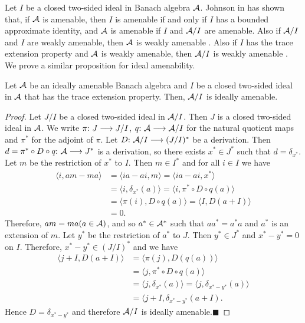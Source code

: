 \documentclass[fleqn]{mat01}
\begin{document}
Let $I$ be a closed two-sided ideal in Banach algebra $\cal A$.
Johnson in \cite{Jo1} has shown that, if ${\cal A}$ is amenable,
then $I$ is amenable if and only if $I$ has a bounded approximate
identity, and $\cal A$ is amenable if $I$ and ${\cal A}/I$ are amenable.
Also if ${\cal A}/I$ and $I$ are weakly amenable, then $\cal A$ is
weakly amenable \cite{Gr2}. Also if $I$ has the trace extension property
and $\cal A$ is weakly amenable, then ${\cal A}/I$ is weakly amenable
\cite{Gr2}. We prove a similar proposition for ideal amenability.

\begin{theor}[\!]
Let ${\cal A}$ be an ideally amenable Banach algebra and $I$ be a closed
two-sided ideal in ${\cal A}$ that has the trace extension property.
Then{\rm ,} ${\cal A} /I$ is ideally amenable.
\end{theor}

\begin{proof}
Let $J/I$ be a closed two-sided ideal in ${\cal A}/ I$. Then $J$ is a
closed two-sided ideal in ${\cal A}$. We write $\pi\hbox{:}\ J
\longrightarrow J/I$, $q\hbox{:}\ {\cal A} \longrightarrow {\cal A} /I$
for the natural quotient maps and $\pi ^*$ for the adjoint of $\pi$. Let
$D\hbox{:}\ {\cal A}/I \longrightarrow (J/I)^*$ be a derivation. Then
$d= \pi^* \circ D \circ q\hbox{:}\ {\cal A} \longrightarrow J^*$ is a
derivation, so there exists $x^* \in J^*$ such that $d = \delta _{x^*}$.
Let $m$ be the restriction of $x^*$ to $I$. Then $m \in I^*$ and for all
$i \in I$ we have
\begin{align*}
\langle i, am -ma \rangle &= \langle ia -ai , m \rangle = \langle ia
-ai, x^*\rangle \\[.2pc]
&= \langle i , \delta _{x^*} (a) \rangle = \langle i , \pi^* \circ D
\circ q (a) \rangle \\[.2pc]
&= \langle \pi (i) , D \circ q (a) \rangle = \langle I , D(a+I)\rangle\\[.2pc]
&= 0.
\end{align*}
Therefore, $am = ma (a \in {\cal A})$, and so $a^* \in {\cal A} ^*$ such
that $ aa^* = a^* a$ and $a^*$ is an extension of $m$. Let $y^*$ be
the restriction of $ a^* $ to $J$. Then $ y^* \in J^*$ and $ x^* - y^*
=0 $ on $I$. Therefore, $x^* - y^* \in (J/I) ^* $ and we have
\begin{align*}
\langle j+ I, D( a+ I)\rangle &= \langle \pi (j), D(q(a))\rangle \\[.2pc]
&= \langle j, \pi^* \circ D \circ q (a)\rangle \\[.2pc]
&= \langle j , \delta _ {x^*} (a) \rangle = \langle j , \delta _{x^* -
y^* } (a) \rangle\\[.2pc]
&= \langle j + I , \delta _{x^* - y^* } (a+I).
\end{align*}
Hence $D= \delta _{x^* - y^*}$ and therefore ${\cal A}/I$ is ideally
amenable.\hfill $\blacksquare$
\end{proof}
\end{document}
